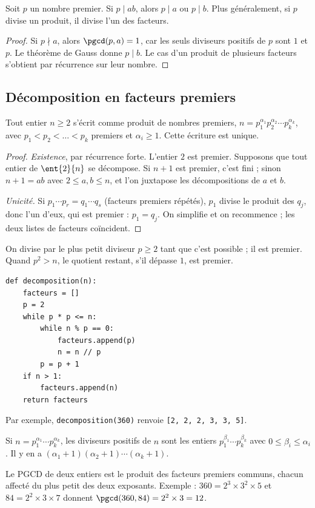 \begin{theorem}
Soit $p$ un nombre premier. Si $p\mid ab$, alors $p\mid a$ ou $p\mid b$. Plus généralement, si $p$ divise un produit, il divise l'un des facteurs.
\end{theorem}
\begin{proof}
Si $p\nmid a$, alors $\pgcd(p,a)=1$, car les seuls diviseurs positifs de $p$ sont $1$ et $p$. Le théorème de Gauss donne $p\mid b$. Le cas d'un produit de plusieurs facteurs s'obtient par récurrence sur leur nombre.
\end{proof}

\subsection{Décomposition en facteurs premiers}
\begin{theorem}[Décomposition]
Tout entier $n\ge2$ s'écrit comme produit de nombres premiers, $n=p_1^{\alpha_1}p_2^{\alpha_2}\cdots p_k^{\alpha_k}$, avec $p_1<p_2<\dots<p_k$ premiers et $\alpha_i\ge1$. Cette écriture est unique.
\end{theorem}
\begin{proof}
\emph{Existence}, par récurrence forte. L'entier $2$ est premier. Supposons que tout entier de $\ent{2}{n}$ se décompose. Si $n+1$ est premier, c'est fini ; sinon $n+1=ab$ avec $2\le a,b\le n$, et l'on juxtapose les décompositions de $a$ et $b$.\par
\emph{Unicité.} Si $p_1\cdots p_r=q_1\cdots q_s$ (facteurs premiers répétés), $p_1$ divise le produit des $q_j$, donc l'un d'eux, qui est premier : $p_1=q_j$. On simplifie et on recommence ; les deux listes de facteurs coïncident.
\end{proof}
\begin{keypoint}
On divise par le plus petit diviseur $p\ge2$ tant que c'est possible ; il est premier. Quand $p^2>n$, le quotient restant, s'il dépasse $1$, est premier.
\begin{lstlisting}
def decomposition(n):
    facteurs = []
    p = 2
    while p * p <= n:
        while n % p == 0:
            facteurs.append(p)
            n = n // p
        p = p + 1
    if n > 1:
        facteurs.append(n)
    return facteurs
\end{lstlisting}
Par exemple, \texttt{decomposition(360)} renvoie \texttt{[2, 2, 2, 3, 3, 5]}.
\end{keypoint}
\begin{theorem}[Diviseurs]
Si $n=p_1^{\alpha_1}\cdots p_k^{\alpha_k}$, les diviseurs positifs de $n$ sont les entiers $p_1^{\beta_1}\cdots p_k^{\beta_k}$ avec $0\le\beta_i\le\alpha_i$. Il y en a $(\alpha_1+1)(\alpha_2+1)\cdots(\alpha_k+1)$.
\end{theorem}
\begin{method}
Le PGCD de deux entiers est le produit des facteurs premiers communs, chacun affecté du plus petit des deux exposants. Exemple : $360=2^3\times3^2\times5$ et $84=2^2\times3\times7$ donnent $\pgcd(360,84)=2^2\times3=12$.
\end{method}


